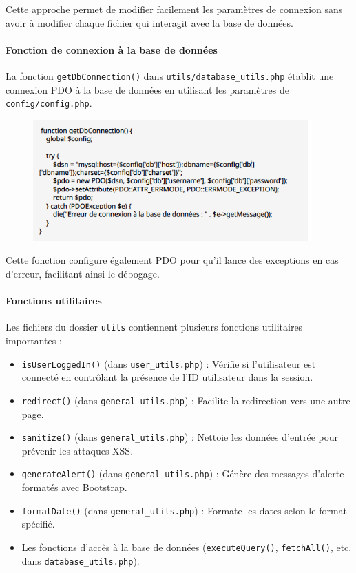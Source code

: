 \documentclass[a4paper,12pt]{article}
\begin{document}
Cette approche permet de modifier facilement les paramètres de connexion sans avoir à modifier chaque fichier qui interagit avec la base de données.

\paragraph{Fonction de connexion à la base de données}
La fonction \texttt{getDbConnection()} dans \texttt{utils/database\_utils.php} établit une connexion PDO à la base de données en utilisant les paramètres de \texttt{config/config.php}.
\begin{figure}[H]
  \centering
  \includegraphics[width=0.95\textwidth]{capture2.png}
\end{figure}
Cette fonction configure également PDO pour qu'il lance des exceptions en cas d'erreur, facilitant ainsi le débogage.

\paragraph{Fonctions utilitaires}
Les fichiers du dossier \texttt{utils} contiennent plusieurs fonctions utilitaires importantes :
\begin{itemize}
    \item \texttt{isUserLoggedIn()} (dans \texttt{user\_utils.php}) : Vérifie si l'utilisateur est connecté en contrôlant la présence de l'ID utilisateur dans la session.
    \item \texttt{redirect()} (dans \texttt{general\_utils.php}) : Facilite la redirection vers une autre page.
    \item \texttt{sanitize()} (dans \texttt{general\_utils.php}) : Nettoie les données d'entrée pour prévenir les attaques XSS.
    \item \texttt{generateAlert()} (dans \texttt{general\_utils.php}) : Génère des messages d'alerte formatés avec Bootstrap.
    \item \texttt{formatDate()} (dans \texttt{general\_utils.php}) : Formate les dates selon le format spécifié.
    \item Les fonctions d'accès à la base de données (\texttt{executeQuery()}, \texttt{fetchAll()}, etc. dans \texttt{database\_utils.php}).
\end{itemize}
\end{document}
